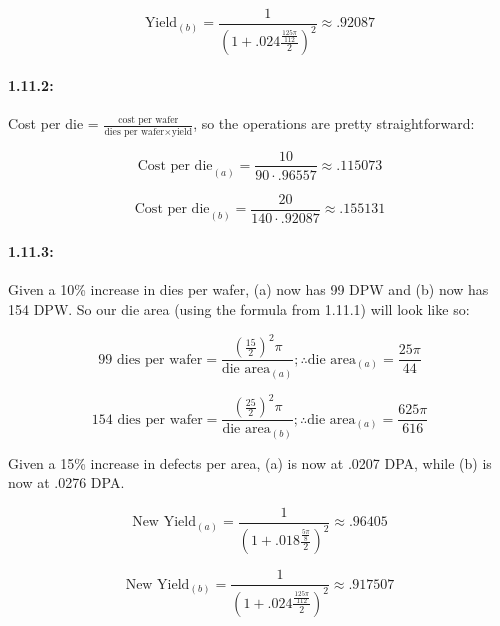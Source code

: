 \documentclass[a4paper]{article}
\begin{document}
\begin{equation}
\mbox{Yield}_{(b)} = \frac{1}{(1+.024 \frac{\frac{125\pi}{112}}{2})^2} \approx{.92087}
\end{equation}

\paragraph*{1.11.2:} Cost per die = $\frac{\mbox{cost per wafer}}{\mbox{dies per wafer} \times \mbox{yield}}$, so the operations are pretty straightforward:

\begin{equation}
\mbox{Cost per die}_{(a)} = \frac{10}{90 \cdot .96557} \approx{.115073}
\end{equation}

\begin{equation}
\mbox{Cost per die}_{(b)} = \frac{20}{140 \cdot .92087} \approx{.155131}
\end{equation}

\paragraph*{1.11.3:} Given a 10\% increase in dies per wafer, (a) now has 99 DPW and (b) now has 154 DPW. So our die area (using the formula from 1.11.1) will look like so:

\begin{equation}
99\mbox{ dies per wafer} = \frac{(\frac{15}{2})^2 \pi}{\mbox{die area}_{(a)}}; \therefore \mbox{die area}_{(a)} = \frac{25 \pi}{44}
\end{equation}

\begin{equation}
154\mbox{ dies per wafer} = \frac{(\frac{25}{2})^2 \pi}{\mbox{die area}_{(b)}}; \therefore \mbox{die area}_{(a)} = \frac{625 \pi}{616}
\end{equation}

Given a 15\% increase in defects per area, (a) is now at .0207 DPA, while (b) is now at .0276 DPA. 

\begin{equation}
\mbox{New Yield}_{(a)} = \frac{1}{(1+.018 \frac{\frac{5\pi}{8}}{2})^2} \approx{.96405}
\end{equation}

\begin{equation}
\mbox{New Yield}_{(b)} = \frac{1}{(1+.024 \frac{\frac{125\pi}{112}}{2})^2} \approx{.917507}
\end{equation}
\end{document}
